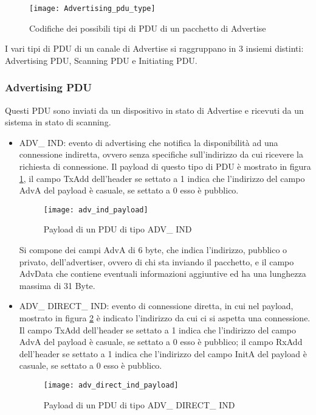 \begin{figure}[H]
\texttt{[image: Advertising\_pdu\_type]}
\centering
\caption{Codifiche dei possibili tipi di PDU di un pacchetto di Advertise}
\end{figure}
 
I vari tipi di PDU di un canale di Advertise si raggruppano in 3 insiemi distinti: Advertising PDU, Scanning PDU e Initiating PDU.

\subsubsection{Advertising PDU}

Questi PDU sono inviati da un dispositivo in stato di Advertise e ricevuti da un sistema in stato di scanning.

\begin{itemize}
\item ADV\_ IND: evento di advertising che notifica la disponibilità ad una connessione indiretta, ovvero senza specifiche sull'indirizzo da cui ricevere la richiesta di connessione.
Il payload di questo tipo di PDU è mostrato in figura \ref{adv_ind_payload}, il campo TxAdd dell'header se settato a 1 indica che l'indirizzo del campo AdvA del payload è casuale, se settato a 0 esso è pubblico.

\begin{figure}[H]
\texttt{[image: adv\_ind\_payload]}
\centering
\caption{Payload di un PDU di tipo ADV\_ IND }
\label{adv_ind_payload}
\end{figure}

Si compone dei campi AdvA di 6 byte, che indica l'indirizzo, pubblico o privato, dell'advertiser, ovvero di chi sta inviando il pacchetto, e il campo AdvData che contiene eventuali informazioni aggiuntive ed ha una lunghezza massima di 31 Byte.

\item ADV\_ DIRECT\_ IND: evento di connessione diretta, in cui nel payload, mostrato in figura \ref{adv_direct_ind_payload} è indicato l'indirizzo da cui ci si aspetta una connessione. Il campo TxAdd dell'header se settato a 1 indica che l'indirizzo del campo AdvA del payload è casuale, se settato a 0 esso è pubblico;
il campo RxAdd dell'header se settato a 1 indica che l'indirizzo del campo InitA del payload è casuale, se settato a 0 esso è pubblico. 

\begin{figure}[H]
\texttt{[image: adv\_direct\_ind\_payload]}
\centering
\caption{Payload di un PDU di tipo ADV\_ DIRECT\_ IND }
\label{adv_direct_ind_payload}
\end{figure}


\end{itemize}
